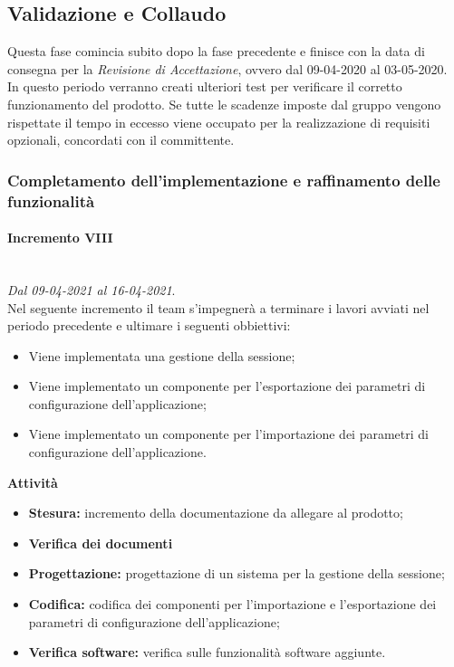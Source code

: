\subsection{Validazione e Collaudo}
Questa fase comincia subito dopo la fase precedente e finisce con la data di consegna per la \textit{Revisione di Accettazione}, ovvero dal 09-04-2020 al 03-05-2020.\\
In questo periodo verranno creati ulteriori test per verificare il corretto funzionamento del prodotto. Se tutte le scadenze imposte dal gruppo vengono rispettate il tempo in eccesso viene occupato per la realizzazione di requisiti opzionali, concordati con il committente. 
\subsubsection{Completamento dell'implementazione e raffinamento delle funzionalità}
\paragraph{Incremento VIII}\textit{}\\
\textit{Dal 09-04-2021 al 16-04-2021}. \\ 
Nel seguente incremento il team s'impegnerà a terminare i lavori avviati nel periodo precedente e ultimare i seguenti obbiettivi:
\begin{itemize}
	\item Viene implementata una gestione della sessione;
	\item Viene implementato un componente per l'esportazione dei parametri di configurazione dell'applicazione;
	\item Viene implementato un componente per l'importazione dei parametri di configurazione dell'applicazione.
\end{itemize}			
\textbf{Attività}			
\begin{itemize}
\item \textbf{Stesura:} incremento della documentazione da allegare al prodotto;
\item \textbf{Verifica dei documenti} 
\item \textbf{Progettazione:} progettazione di un sistema per la gestione della sessione;
\item \textbf{Codifica:} codifica dei componenti per l'importazione e l'esportazione dei parametri di configurazione dell'applicazione;
\item \textbf{Verifica software:} verifica sulle funzionalità software aggiunte.
\end{itemize}
